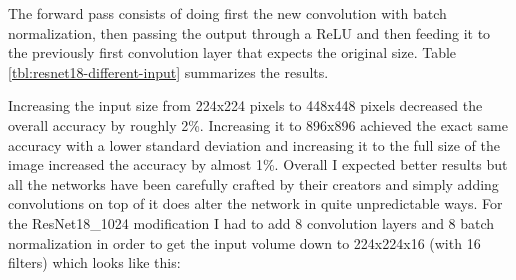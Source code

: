 The forward pass consists of doing first the new convolution with batch normalization, then passing the output through a ReLU and then feeding it to the previously first convolution layer that expects the original size. Table \ref{tbl:resnet18-different-input} summarizes the results.

\begin{table}[!h] \centering
{}
\caption{Different image input sizes are fed into ResNet18 architectures with only 16 filters per layer. The first layers of the network have been adapted to allow bigger input images}
\label{tbl:resnet18-different-input}
\end{table}

Increasing the input size from 224x224 pixels to 448x448 pixels decreased the overall accuracy by roughly 2\%. Increasing it to 896x896 achieved the exact same accuracy with a lower standard deviation and increasing it to the full size of the image increased the accuracy by almost 1\%. Overall I expected better results but all the networks have been carefully crafted by their creators and simply adding convolutions on top of it does alter the network in quite unpredictable ways. For the ResNet18\_1024 modification I had to add 8 convolution layers and 8 batch normalization in order to get the input volume down to 224x224x16 (with 16 filters) which looks like this:

